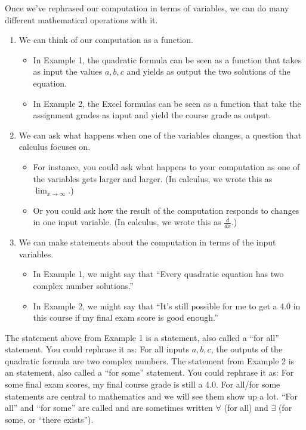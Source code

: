 \documentclass[letterpaper,10pt,english]{sphinxmanual}
\begin{document}
Once we’ve rephrased our computation in terms of variables, we can do many different mathematical operations with it.
\begin{enumerate}
%
\item {} 
We can think of our computation as a function.
\begin{itemize}
\item {} 
In Example 1, the quadratic formula can be seen as a function that takes as input the values \(a,b,c\) and yields as output the two solutions of the equation.

\item {} 
In Example 2, the Excel formulas can be seen as a function that take the assignment grades as input and yield the course grade as output.

\end{itemize}

\item {} 
We can ask what happens when one of the variables changes, a question that calculus focuses on.
\begin{itemize}
\item {} 
For instance, you could ask what happens to your computation as one of the variables gets larger and larger.  (In calculus, we wrote this as \(\lim_{x\to\infty}\).)

\item {} 
Or you could ask how the result of the computation responds to changes in one input variable.  (In calculus, we wrote this as \(\frac{d}{dx}\).)

\end{itemize}

\item {} 
We can make statements about the computation in terms of the input variables.
\begin{itemize}
\item {} 
In Example 1, we might say that “Every quadratic equation has two complex number solutions.”

\item {} 
In Example 2, we might say that “It’s still possible for me to get a 4.0 in this course if my final exam score is good enough.”

\end{itemize}

\end{enumerate}

The statement above from Example 1 is a  statement, also called a “for all” statement.  You could rephrase it as:  For all inputs \(a,b,c\), the outputs of the quadratic formula are two complex numbers.  The statement from Example 2 is an  statement, also called a “for some” statement.  You could rephrase it as:  For some final exam scores, my final course grade is still a 4.0.  For all/for some statements are central to mathematics and we will see them show up a lot.  “For all” and “for some” are called  and are sometimes written \(\forall\) (for all) and \(\exists\) (for some, or “there exists”).
\end{document}

